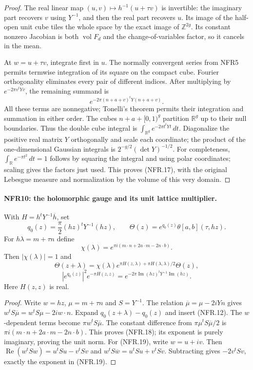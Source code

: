 \begin{proof}
The real linear map $(u,v)\mapsto h^{-1}(u+\tau v)$ is invertible:
the imaginary part recovers $v$ using $Y^{-1}$, and then the
real part recovers $u$.  Its image of the half-open unit cube
tiles the whole space by the exact image of $\mathbb Z^{2g}$.
Its constant nonzero Jacobian is both $\operatorname{vol}F_d$
and the change-of-variables factor, so it cancels in the mean.

At $w=u+\tau v$, integrate first in $u$.
The normally convergent series from NFR5 permits termwise
integration of its square on the compact cube.
Fourier orthogonality eliminates every pair of different indices.
After multiplying by $e^{-2\pi v^tYv}$, the remaining summand is
\[
                       e^{-2\pi(n+a+v)^tY(n+a+v)}.
\]
All these terms are nonnegative; Tonelli's theorem permits their
integration and summation in either order.  The cubes
$n+a+[0,1)^g$ partition $\mathbb R^g$ up to their null boundaries.
Thus the double cube integral is
$\int_{\mathbb R^g}e^{-2\pi t^tYt}\,dt$.
Diagonalize the positive real matrix $Y$ orthogonally and scale
each coordinate; the product of the one-dimensional Gaussian
integrals is $2^{-g/2}(\det Y)^{-1/2}$.
For completeness, $\int_{\mathbb R}e^{-\pi t^2}\,dt=1$
follows by squaring the integral and using polar coordinates;
scaling gives the factors just used.
This proves (NFR.17), with the original Lebesgue measure and
normalization by the volume of this very domain.
\end{proof}

\paragraph{NFR10: the holomorphic gauge and its unit lattice multiplier.}
\label{claim:NFR10}
With $H=h^tY^{-1}\overline h$, set
\[
 q_0(z)=\frac\pi2(hz)^tY^{-1}(hz),\qquad
 \Theta(z)=e^{q_0(z)}\theta[a,b](\tau,hz).
\]
For $h\lambda=m+\tau n$ define
\[
 \chi(\lambda)=e^{\pi i(m\cdot n+2a\cdot m-2n\cdot b)}.
\]
Then $|\chi(\lambda)|=1$ and
\[
 \Theta(z+\lambda)=\chi(\lambda)
       e^{\pi H(z,\lambda)+\pi H(\lambda,\lambda)/2}\Theta(z),
 \tag{NFR.18}
\]
\[
 |e^{q_0(z)}|^2e^{-\pi H(z,z)}
             =e^{-2\pi\operatorname{Im}(hz)^tY^{-1}\operatorname{Im}(hz)}.
 \tag{NFR.19}
\]
Here $H(z,z)$ is real.

\begin{proof}
Write $w=hz$, $\mu=m+\tau n$ and $S=Y^{-1}$.
The relation $\overline\mu=\mu-2iYn$ gives
$w^tS\overline\mu=w^tS\mu-2iw\cdot n$.
Expand $q_0(z+\lambda)-q_0(z)$ and insert (NFR.12).
The $w$-dependent terms become $\pi w^tS\overline\mu$.
The constant difference from
$\pi\mu^tS\overline\mu/2$ is
$\pi i(m\cdot n+2a\cdot m-2n\cdot b)$.
This proves (NFR.18); its exponent is purely imaginary, proving
the unit norm.  For (NFR.19), write $w=u+iv$.
Then $\operatorname{Re}(w^tSw)=u^tSu-v^tSv$ and
$w^tS\overline w=u^tSu+v^tSv$.
Subtracting gives $-2v^tSv$, exactly the exponent in (NFR.19).
\end{proof}

